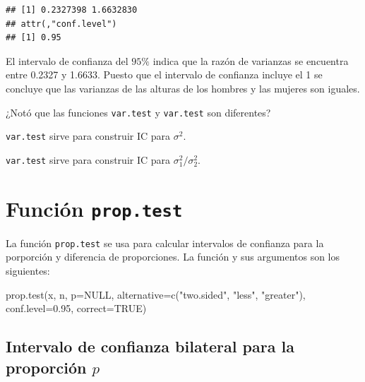 \documentclass[
]{book}
\makeatletter
\newenvironment{Shaded}{\begin{snugshade}}{\end{snugshade}}
\newcommand{\AttributeTok}[1]{\textcolor[rgb]{0.77,0.63,0.00}{#1}}
\newcommand{\ConstantTok}[1]{\textcolor[rgb]{0.00,0.00,0.00}{#1}}
\newcommand{\FloatTok}[1]{\textcolor[rgb]{0.00,0.00,0.81}{#1}}
\newcommand{\FunctionTok}[1]{\textcolor[rgb]{0.00,0.00,0.00}{#1}}
\newcommand{\NormalTok}[1]{#1}
\newcommand{\StringTok}[1]{\textcolor[rgb]{0.31,0.60,0.02}{#1}}
\newenvironment{kframe}{%
\medskip{}
\setlength{\fboxsep}{.8em}
 \def\at@end@of@kframe{}%
 \ifinner\ifhmode%
  \def\at@end@of@kframe{\end{minipage}}%
  \begin{minipage}{\columnwidth}%
 \fi\fi%
 \def\FrameCommand##1{\hskip\@totalleftmargin \hskip-\fboxsep
 \colorbox{shadecolor}{##1}\hskip-\fboxsep
     \hskip-\linewidth \hskip-\@totalleftmargin \hskip\columnwidth}%
 \MakeFramed {\advance\hsize-\width
   \@totalleftmargin\z@ \linewidth\hsize
   \@setminipage}}%
 {\par\unskip\endMakeFramed%
 \at@end@of@kframe}
\renewenvironment{Shaded}{\begin{kframe}}{\end{kframe}}
\newenvironment{rmdblock}[1]
  {
  \begin{itemize}
  \renewcommand{\labelitemi}{
    \raisebox{-.7\height}[0pt][0pt]{
      {\setkeys{Gin}{width=3em,keepaspectratio}\texttt{[image: images/\#1]}}
    }
  }
  \setlength{\fboxsep}{1em}
  \begin{kframe}
  \item
  }
  {
  \end{kframe}
  \end{itemize}
  }
\newenvironment{rmdwarning}
  {\begin{rmdblock}{warning}}
  {\end{rmdblock}}
\makeatother
\begin{document}
\begin{verbatim}
## [1] 0.2327398 1.6632830
## attr(,"conf.level")
## [1] 0.95
\end{verbatim}

El intervalo de confianza del \(95\%\) indica que la razón de varianzas se encuentra entre 0.2327 y 1.6633. Puesto que el intervalo de confianza incluye el 1 se concluye que las varianzas de las alturas de los hombres y las mujeres son iguales.

\begin{rmdwarning}
¿Notó que las funciones \texttt{var.test} y \texttt{var.test} son diferentes?

\texttt{var.test} sirve para construir IC para \(\sigma^2\).

\texttt{var.test} sirve para construir IC para \(\sigma_1^2 / \sigma_2^2\).
\end{rmdwarning}

\hypertarget{funciuxf3n-prop.test}{%
\section{\texorpdfstring{Función \texttt{prop.test}}{Función prop.test}}\label{funciuxf3n-prop.test}}

La función \texttt{prop.test} se usa para calcular intervalos de confianza para la porporción y diferencia de proporciones. La función y sus argumentos son los siguientes:

\begin{Shaded}
\begin{Highlighting}[]
\FunctionTok{prop.test}\NormalTok{(x, n, }\AttributeTok{p=}\ConstantTok{NULL}\NormalTok{,}
          \AttributeTok{alternative=}\FunctionTok{c}\NormalTok{(}\StringTok{"two.sided"}\NormalTok{, }\StringTok{"less"}\NormalTok{, }\StringTok{"greater"}\NormalTok{),}
          \AttributeTok{conf.level=}\FloatTok{0.95}\NormalTok{, }\AttributeTok{correct=}\ConstantTok{TRUE}\NormalTok{)}
\end{Highlighting}
\end{Shaded}

\hypertarget{intervalo-de-confianza-bilateral-para-la-proporciuxf3n-p}{%
\subsection{\texorpdfstring{Intervalo de confianza bilateral para la proporción \(p\)}{Intervalo de confianza bilateral para la proporción p}}\label{intervalo-de-confianza-bilateral-para-la-proporciuxf3n-p}}
\end{document}
